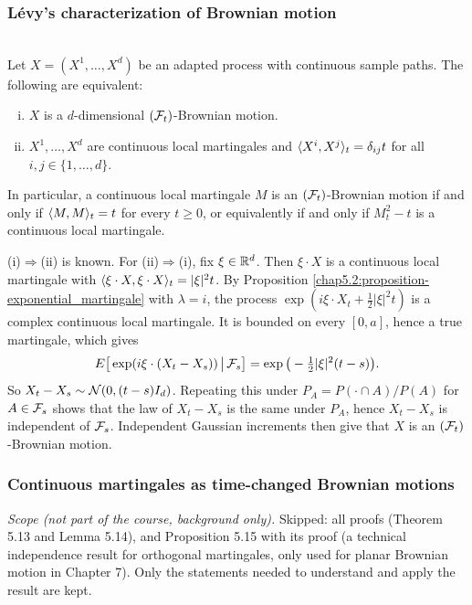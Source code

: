 \subsubsection{Lévy's characterization of Brownian motion}

\begin{theorem}\label{chap5.3.1:theorem-levy}
\\
Let $X=(X^1,\dots,X^d)$ be an adapted process with continuous sample paths. The following are equivalent:
\begin{enumerate}[(i)]
    \item $X$ is a $d$-dimensional $(\mathcal{F}_t)$-Brownian motion.
    \item $X^1,\dots,X^d$ are continuous local martingales and $\langle X^i,X^j\rangle_t=\delta_{ij}t$ for all $i,j\in\{1,\dots,d\}$.
\end{enumerate}
In particular, a continuous local martingale $M$ is an $(\mathcal{F}_t)$-Brownian motion if and only if $\langle M,M\rangle_t=t$ for every $t\geq0$, or equivalently if and only if $M_t^2-t$ is a continuous local martingale.
\end{theorem}

\begin{proofidea}
(i)$\Rightarrow$(ii) is known. For (ii)$\Rightarrow$(i), fix $\xi\in\mathbb{R}^d$. Then $\xi\cdot X$ is a continuous local martingale with $\langle \xi\cdot X,\xi\cdot X\rangle_t=|\xi|^2t$. By Proposition \ref{chap5.2:proposition-exponential_martingale} with $\lambda=i$, the process $\exp(i\xi\cdot X_t+\frac12|\xi|^2t)$ is a complex continuous local martingale. It is bounded on every $[0,a]$, hence a true martingale, which gives
$$E\big[\exp(i\xi\cdot(X_t-X_s))\,\big|\,\mathcal{F}_s\big]=\exp\big(-\tfrac12|\xi|^2(t-s)\big).$$
So $X_t-X_s\sim\mathcal{N}(0,(t-s)I_d)$. Repeating this under $P_A=P(\cdot\cap A)/P(A)$ for $A\in\mathcal{F}_s$ shows that the law of $X_t-X_s$ is the same under $P_A$, hence $X_t-X_s$ is independent of $\mathcal{F}_s$. Independent Gaussian increments then give that $X$ is an $(\mathcal{F}_t)$-Brownian motion.
\end{proofidea}

\subsubsection{Continuous martingales as time-changed Brownian motions}
\noindent\textit{Scope (not part of the course, background only).} Skipped: all proofs (Theorem 5.13 and Lemma 5.14), and Proposition 5.15 with its proof (a technical independence result for orthogonal martingales, only used for planar Brownian motion in Chapter 7). Only the statements needed to understand and apply the result are kept.

